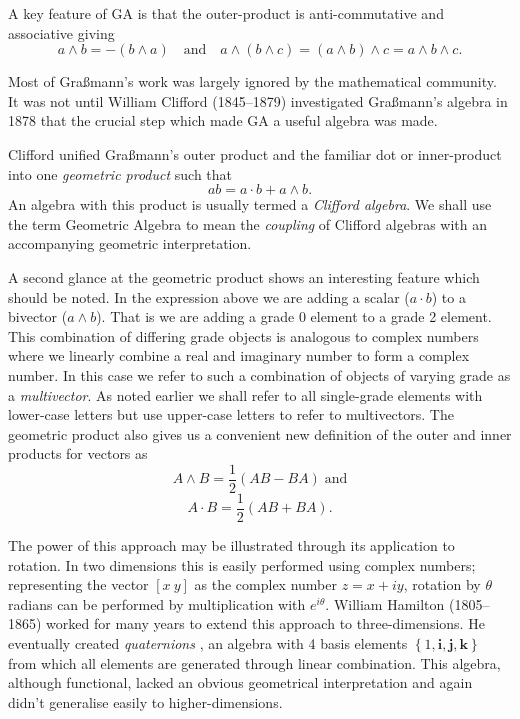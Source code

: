 A key feature of GA is that the outer-product is anti-commutative and
associative giving
\begin{displaymath}
a \wedge b = - ( b \wedge a)\quad\mbox{and}\quad
a \wedge (b \wedge c) = (a \wedge b) \wedge c = a \wedge b \wedge c.
\end{displaymath}

Most of Gra{\ss}mann's work was largely ignored by the mathematical community.
It was not until William Clifford (1845--1879) investigated Gra{\ss}mann's
algebra in 1878\cite{GA:clifford} that the crucial step which made GA a useful
algebra was made.

Clifford unified Gra{\ss}mann's outer product and the familiar dot
or inner-product into one \emph{geometric product} such that
\begin{displaymath}
ab = a\cdot b + a \wedge b.
\end{displaymath}
An algebra with this product is usually termed a \emph{Clifford algebra}. We
shall use the term Geometric Algebra to mean the \emph{coupling} of Clifford
algebras with an accompanying geometric interpretation.

A second glance at the geometric product shows an interesting feature which
should be noted. In the expression above we are adding a scalar ($a \cdot b$)
to a bivector ($a \wedge b$). That is we are adding a grade 0 element to a
grade 2 element. This combination of differing grade objects is analogous to
complex numbers where we linearly combine a real and imaginary number to form
a complex number. In this case we refer to such a combination of objects of
varying grade as a \emph{multivector}.  As noted earlier we shall refer to all
single-grade elements with lower-case letters but use upper-case letters to
refer to multivectors. The geometric product also gives us a convenient new
definition of the outer and inner products for vectors as
\[
A \wedge B = \frac{1}{2}(AB - BA)\;\mbox{and}
\]
\[
A \cdot B = \frac{1}{2}(AB + BA).
\]

The power of this approach may be illustrated through its application to
rotation. In two dimensions this is easily performed using complex numbers;
representing the vector $[x\ y]$ as the complex number $z = x + iy$, rotation
by $\theta$ radians can be performed by multiplication with $e^{i\theta}$.
William Hamilton (1805--1865) worked for many years to extend this approach to
three-dimensions. He eventually created \emph{quaternions}
\cite{hamilton2,hamilton1}, an algebra with 4 basis elements $\left\{1,
\mathbf{i}, \mathbf{j}, \mathbf{k}\right\}$ from which all elements are
generated through linear combination. This algebra, although functional,
lacked an obvious geometrical interpretation and again didn't generalise
easily to higher-dimensions.

